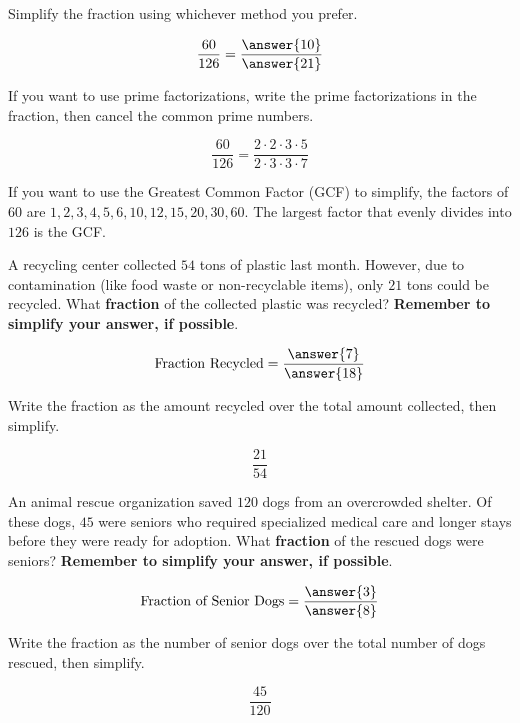 \documentclass{ximera}[font=12pt]  %
\begin{document}
\begin{problem}
  Simplify the fraction using whichever method you prefer.


  \[ \frac{60}{126} = \frac{\answer{10}}{\answer{21}} \]

  \begin{hint}
   If you want to use prime factorizations, write the prime factorizations in the fraction, then cancel the common prime numbers.

    \[ \frac{60}{126} = \frac{2 \cdot 2 \cdot 3 \cdot 5}{2 \cdot 3 \cdot 3 \cdot 7} \]

  \end{hint}

  \begin{hint}
    If you want to use the Greatest Common Factor (GCF) to simplify, the factors of $60$ are $1, 2, 3, 4, 5, 6, 10, 12, 15, 20, 30, 60.$  The
    largest factor that evenly divides into $126$ is the GCF. 
  \end{hint}

\end{problem}


\begin{problem}
  A recycling center collected $54$ tons of plastic last month.  However, due to contamination (like food waste or non-recyclable items), 
  only $21$ tons could be recycled.  What \textbf{fraction} of the collected plastic was recycled?  \textbf{Remember to simplify your answer, if possible}.

  \[ \text{Fraction Recycled} = \frac{\answer{7}}{\answer{18}} \]

  \begin{hint}
    Write the fraction as the amount recycled over the total amount collected, then simplify.

    \[ \frac{21}{54} \]
  \end{hint}

\end{problem}


\begin{problem}
An animal rescue organization saved $120$ dogs from an overcrowded shelter.  Of these dogs, $45$ were seniors who required specialized 
medical care and longer stays before they were ready for adoption.  What \textbf{fraction} of the rescued dogs were seniors?  
\textbf{Remember to simplify your answer, if possible}.

\[ \text{Fraction of Senior Dogs} = \frac{\answer{3}}{\answer{8}} \]

\begin{hint}
Write the fraction as the number of senior dogs over the total number of dogs rescued, then simplify.

\[ \frac{45}{120} \]
\end{hint}
\end{problem}
\end{document}

